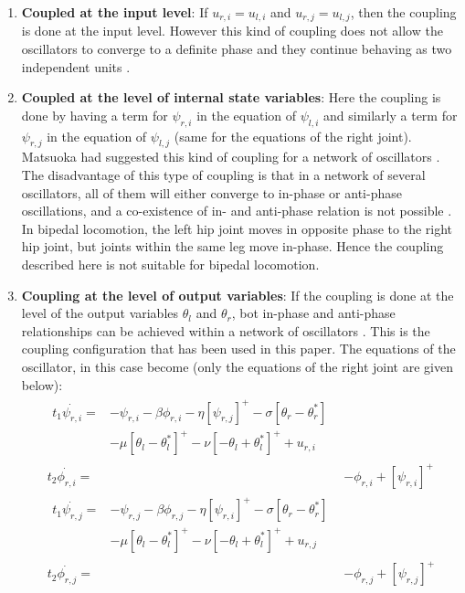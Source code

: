 \documentclass[12pt,twoside]{article}
\theoremstyle{plain}
\theoremstyle{definition}
\theoremstyle{remark}
\begin{document}
\begin{enumerate}
\item \textbf{Coupled at the input level}: If $u_{r,i}=u_{l,i}$ and $u_{r,j}=u_{l,j}$, then the coupling is done at the input level. However this kind of coupling does not allow the oscillators to converge to a definite phase and they continue behaving as two independent units \cite{Ronsse2009}.
\item \textbf{Coupled at the level of internal state variables}: Here the coupling is done by having a term for $\psi_{r,i}$ in the equation of $\psi_{l,i}$ and similarly a term for $\psi_{r,j}$ in the equation of $\psi_{l,j}$ (same for the equations of the right joint). Matsuoka had suggested this kind of coupling for a network of oscillators \cite{Matsuoka1987}. The disadvantage of this type of coupling is that in a network of several oscillators, all of them will either converge to in-phase or anti-phase oscillations, and a co-existence of in- and anti-phase relation is not possible \cite{Ronsse2009}. In bipedal locomotion, the left hip joint moves in opposite phase to the right hip joint, but joints within the same leg move in-phase. Hence the coupling described here is not suitable for bipedal locomotion.
\item \textbf{Coupling at the level of output variables}: If the coupling is done at the level of the output variables $\theta_l$ and $\theta_r$, bot in-phase and anti-phase relationships can be achieved within a network of oscillators \cite{Ronsse2009}. This is the coupling configuration that has been used in this paper. The equations of the oscillator, in this case become (only the equations of the right joint are given below):\\
\begin{subequations}
\label{eq:matsuoka_coupled}
%
\begin{align}
\label{eq:matsuoka_coupled1}
\begin{split}
t_1 \dot{\psi_{r,i}}={}& -\psi_{r,i} - \beta \phi_{r,i} - \eta [\psi_{r,j}]^+ - \sigma [\theta_r - \theta^{*}_r]\\ 
& - \mu [\theta_l - \theta_l^*]^+ - \nu [-\theta_l + \theta_l^*]^+ + u_{r,i} 
\end{split}
\\
%
\label{eq:matsuoka_coupled2}
t_2 \dot{\phi_{r,i}} = {}& -\phi_{r,i} + [\psi_{r,i}]^+
\\
%
\label{eq:matsuoka_coupled3}
\begin{split}
t_1 \dot{\psi_{r,j}}={}& -\psi_{r,j} - \beta \phi_{r,j} - \eta [\psi_{r,i}]^+ - \sigma [\theta_r - \theta^{*}_r]\\
& - \mu [\theta_l - \theta_l^*]^+ - \nu [-\theta_l + \theta_l^*]^+ + u_{r,j}
\end{split}
\\
%
\label{eq:matsuoka_coupled4}
t_2 \dot{\phi_{r,j}} ={}& -\phi_{r,j} + [\psi_{r,j}]^+
\end{align}
%
\end{subequations}
\end{enumerate}
\end{document}
